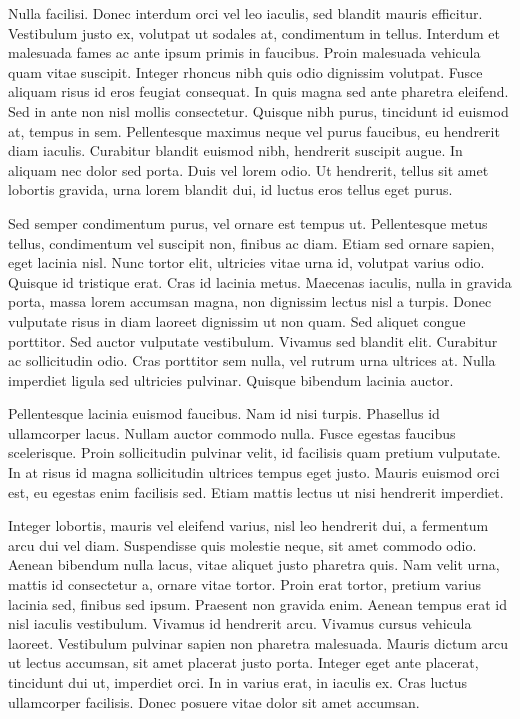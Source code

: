 \documentclass[landscape]{book}
\begin{document}
Nulla facilisi. Donec interdum orci vel leo iaculis, sed blandit mauris efficitur. Vestibulum justo ex, volutpat ut sodales at, condimentum in tellus. Interdum et malesuada fames ac ante ipsum primis in faucibus. Proin malesuada vehicula quam vitae suscipit. Integer rhoncus nibh quis odio dignissim volutpat. Fusce aliquam risus id eros feugiat consequat. In quis magna sed ante pharetra eleifend. Sed in ante non nisl mollis consectetur. Quisque nibh purus, tincidunt id euismod at, tempus in sem. Pellentesque maximus neque vel purus faucibus, eu hendrerit diam iaculis. Curabitur blandit euismod nibh, hendrerit suscipit augue. In aliquam nec dolor sed porta. Duis vel lorem odio. Ut hendrerit, tellus sit amet lobortis gravida, urna lorem blandit dui, id luctus eros tellus eget purus.

Sed semper condimentum purus, vel ornare est tempus ut. Pellentesque metus tellus, condimentum vel suscipit non, finibus ac diam. Etiam sed ornare sapien, eget lacinia nisl. Nunc tortor elit, ultricies vitae urna id, volutpat varius odio. Quisque id tristique erat. Cras id lacinia metus. Maecenas iaculis, nulla in gravida porta, massa lorem accumsan magna, non dignissim lectus nisl a turpis. Donec vulputate risus in diam laoreet dignissim ut non quam. Sed aliquet congue porttitor. Sed auctor vulputate vestibulum. Vivamus sed blandit elit. Curabitur ac sollicitudin odio. Cras porttitor sem nulla, vel rutrum urna ultrices at. Nulla imperdiet ligula sed ultricies pulvinar. Quisque bibendum lacinia auctor.

Pellentesque lacinia euismod faucibus. Nam id nisi turpis. Phasellus id ullamcorper lacus. Nullam auctor commodo nulla. Fusce egestas faucibus scelerisque. Proin sollicitudin pulvinar velit, id facilisis quam pretium vulputate. In at risus id magna sollicitudin ultrices tempus eget justo. Mauris euismod orci est, eu egestas enim facilisis sed. Etiam mattis lectus ut nisi hendrerit imperdiet.

Integer lobortis, mauris vel eleifend varius, nisl leo hendrerit dui, a fermentum arcu dui vel diam. Suspendisse quis molestie neque, sit amet commodo odio. Aenean bibendum nulla lacus, vitae aliquet justo pharetra quis. Nam velit urna, mattis id consectetur a, ornare vitae tortor. Proin erat tortor, pretium varius lacinia sed, finibus sed ipsum. Praesent non gravida enim. Aenean tempus erat id nisl iaculis vestibulum. Vivamus id hendrerit arcu. Vivamus cursus vehicula laoreet. Vestibulum pulvinar sapien non pharetra malesuada. Mauris dictum arcu ut lectus accumsan, sit amet placerat justo porta. Integer eget ante placerat, tincidunt dui ut, imperdiet orci. In in varius erat, in iaculis ex. Cras luctus ullamcorper facilisis. Donec posuere vitae dolor sit amet accumsan.
\end{document}
